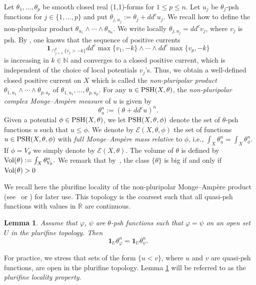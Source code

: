 \documentclass[a4paper]{amsart}
\numberwithin{equation}{section}
\newtheorem{lemma}[theorem]{Lemma}
\theoremstyle{definition}
\newcommand{\Vol}{{\rm Vol}}
\newcommand{\ddc}{dd^c}
\numberwithin{equation}{section}
\newcommand{\capK}{\text{Cap}}
\newcommand{\PSH}{{\rm PSH}}
\newcommand{\N}{\mathbb{N}}
\begin{document}
Let $\theta_1,\ldots,\theta_p$ be smooth closed real (1,1)-forms for $1\leq p\le n$. 
Let $u_j$ be $\theta_j$-psh functions for $j\in\{1,\ldots,p\}$ and put $\theta_{j,u_j}:=\theta_j +\ddc u_j$. We recall how to define the non-pluripolar product $\theta_{u_1} \wedge \cdots \wedge \theta_{u_n}$. We write locally $\theta_{j,u_j}= \ddc v_j$, where $v_j$ is psh. By \cite{bedford1987fine, boucksom2010monge}, one knows that the sequence of positive currents 
$$\mathbf{1}_{\cap_{j=1}^p \{v_j>-k\}}\ddc \max\{v_1, -k\} \wedge \cdots \wedge \ddc \max\{v_p, -k\}$$ 
is increasing in $k \in \N$ and converges to a closed positive current, which is independent of the choice of local potentials $v_j$'s. Thus, we obtain a well-defined closed positive current on $X$ which is called the \emph{non-pluripolar product} $\theta_{1,u_1} \wedge \cdots \wedge \theta_{p,u_p}$ of $\theta_{1,u_1}, \ldots, \theta_{p,u_p}$.  
For any $u\in\PSH(X,\theta)$, the {\em non-pluripolar complex Monge--Amp\`ere measure} of $u$ is given by \[\theta_u^n:= (\theta+\ddc u)^n.\]
Given a potential $\phi\in\PSH(X,\theta)$, we let $\PSH(X,\theta,\phi)$ denote the set of $\theta$-psh functions $u$ such that $u\leq\phi$. We denote by $\mathcal{E}(X,\theta,\phi)$ the set of functions $u\in\PSH(X,\theta,\phi)$ with {\em full Monge--Amp\`ere mass relative} to $\phi$, i.e.,
$\int_X\theta_u^n=\int_X\theta_\phi^n$.
If $\phi=V_\theta$ we simply denote by $\mathcal{E}(X,\theta)$. The volume of $\theta$ is defined by $\Vol(\theta):=\int_X\theta_{V_\theta}^n.$
We remark that by~\cite[Theorem 4.7]{boucksom2002volume}, the class $\{\theta\}$ is big if and only if $\Vol(\theta)>0$



	We recall here the plurifine locality of the non-pluripolar Monge--Amp\`ere product (see~\cite[Corollary 4.3]{bedford1987fine} or \cite[Section 1.2]{boucksom2010monge}) for later use. This topology is the coarsest such that all quasi-psh functions with values in $\mathbb{R}$ are continuous.
\begin{lemma}\label{lem: plurifine}
	Assume that $\varphi$, $\psi$ are $\theta$-psh functions such that $\varphi=\psi$ on an open set $U$ in the plurifine topology. Then 
	\begin{equation*}
	\mathbf{1}_U\theta_\varphi^n=\mathbf{1}_U\theta_\psi^n.
	\end{equation*}
\end{lemma}
For practice, we stress that sets of the form
$\{u < v\}$, where $u$ and $v$ are quasi-psh functions, are open in the plurifine topology. Lemma \ref{lem: plurifine} will be referred to as the {\em plurifine locality property}.
\end{document}

